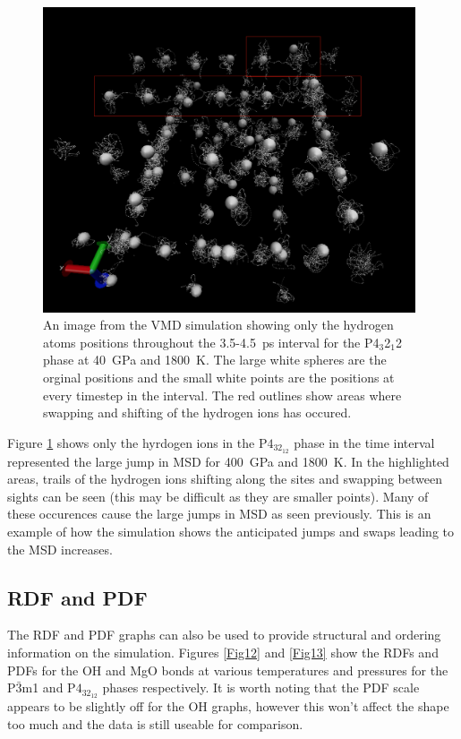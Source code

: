 \documentclass[a4paper,12pt]{article}
\begin{document}
\begin{figure}[h!!!!!!!!]
	\centering
	\includegraphics[width=11cm]{figures/vmd_p4_p400_t1800.png}
	\caption{An image from the VMD simulation showing only the hydrogen atoms positions throughout the 3.5-\SI{4.5}{\pico\second} interval for the P4$_3$2$_1$2 phase at \SI{40}{\GPa} and \SI{1800}{\K}. The large white spheres are the orginal positions and the small white points are the positions at every timestep in the interval. The red outlines show areas where swapping and shifting of the hydrogen ions has occured.}
	\label{Fig11}
\end{figure}

Figure \ref{Fig11} shows only the hyrdogen ions in the P$4_32_12$ phase in the time interval represented the large jump in MSD for \SI{400}{\GPa} and \SI{1800}{\K}. In the highlighted areas, trails of the hydrogen ions shifting along the sites and swapping between sights can be seen (this may be difficult as they are smaller points). Many of these occurences cause the large jumps in MSD as seen previously. This is an example of how the simulation shows the anticipated jumps and swaps leading to the MSD increases.

\newpage
\subsection{RDF and PDF}

The RDF and PDF graphs can also be used to provide structural and ordering information on the simulation. Figures \ref{Fig12} and \ref{Fig13} show the RDFs and PDFs for the OH and MgO bonds at various temperatures and pressures for the P$\bar3$m1 and P$4_32_12$ phases respectively. It is worth noting that the PDF scale appears to be slightly off for the OH graphs, however this won't affect the shape too much and the data is still useable for comparison.
\end{document}
